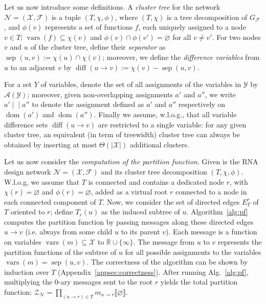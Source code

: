\documentclass{bioinfo}
\newcommand{\network}{\mathcal{N}}
\newcommand{\dom}{\operatorname{dom}} %
\newcommand{\val}{a} %
\newcommand{\vars}{\operatorname{vars}}
\newcommand{\partfun}[1]{\mathcal{Z}_{#1}}
\newcommand{\separator}[2]{\operatorname{sep}(#1,#2)}
\newcommand{\difference}[2]{\operatorname{diff}(#1 \rightarrow #2)}
\newcommand{\real}{\mathbb{R}}
\newcommand{\Message}[2]{m_{#1\rightarrow #2}}
\newcommand{\assignments}{\mathcal{A}}
\newcommand{\F}{\mathcal{F}}
\newcommand{\X}{\mathcal{X}}
\newcommand{\Y}{\mathcal{Y}}
\newcommand{\edgesToR}{E^r_T}
\newcommand{\Def}[1]{{\it #1}}
\newcommand{\evalfor}[2]{#1\llbracket{}#2\rrbracket{}}
\newcommand{\substitute}[2]{#1\!\mid\!\mid\! #2}
\begin{document}
%

Let us now introduce some definitions. A \Def{cluster tree} for the
network $\network=(\X,\F)$ is a tuple $(T,\chi,\phi)$, where
$(T,\chi)$ is a tree decomposition of $G_\F$, and $\phi(v)$ represents
a set of functions $f$, each uniquely assigned to a node $v\in T$;
$\vars(f)\subseteq\chi(v)$ and $\phi(v)\cap \phi(v')=\varnothing$ for
all $v\neq v'$.  For two nodes $v$ and $u$ of the cluster tree, define
their \Def{separator} as $\separator{u}{v} := \chi(u)\cap\chi(v)$;
moreover, we define the \Def{difference variables} from $u$ to an
adjacent $v$ by $\difference{u}{v}:=\chi(v) - \separator{u}{v}$.

For a set $Y$ of variables, denote the set of all assignments of the
variables in $\Y$ by $\assignments(\Y)$; moreover, given
non-overlapping assignments $\val'$ and $\val''$, we write
$\substitute{\val'}{\val''}$ to denote the assignment defined as
$\val'$ and $\val''$ respectively on $\dom(\val')$ and $\dom(\val'')$.
Finally we assume, w.l.o.g., that all variable difference sets
$\difference{u}{v}$ are restricted to a single variable: for any given
cluster tree, an equivalent (in term of treewidth) cluster tree can
always be obtained by inserting at most $\Theta(|\X|)$ additional
clusters.

Let us now consider the \Def{computation of the partition function}.
Given is the RNA design network $\network=(\X,\F)$ and its cluster
tree decomposition $(T,\chi,\phi)$.  W.l.o.g, we assume that $T$ is
connected and contains a dedicated node $r$, with $\chi(r)=\varnothing$
and $\phi(r)=\varnothing$, added as a virtual root
$r$ connected to a node in each connected
component of $T$.  Now, we consider the set of directed edges
$\edgesToR{}$ of $T$ oriented to $r$; define $T_r(u)$ as the induced
subtree of $u$. Algorithm~\ref{alg:pf} computes the partition function by
passing messages along these directed edges $u\to v$ (i.e. always from
some child $u$ to its parent $v$). Each message is a function on
variables $\vars(m)\subseteq \X$ to $\real\cup\{\infty\}$. The message
from $u$ to $v$ represents the partition functions of the subtree of
$u$ for all possible assignments to the variables
$\vars(m)=\separator{u}{v}$. The correctness of the algorithm can be shown by induction over $T$ (Appendix~\ref{appsec:correctness}).
After running Alg.~\ref{alg:pf}, 
multiplying the 0-ary messages sent to the root $r$ yields the total partition function:
\begin{math}
  \partfun{\network} = \prod_{(u\to{}r)\in T} \evalfor{\Message{u}{r}}{\varnothing}.
\end{math}
\end{document}
